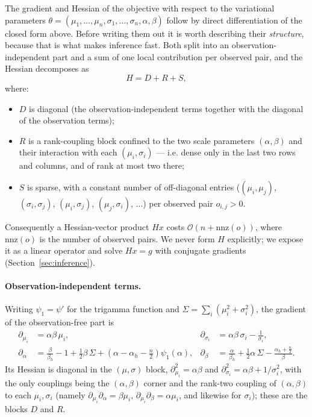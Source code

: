 \documentclass[12pt]{article}
\begin{document}
The gradient and Hessian of the objective with respect to the variational parameters
$\theta = (\mu_1, \dots, \mu_n, \sigma_1, \dots, \sigma_n, \alpha, \beta)$ follow by direct
differentiation of the closed form above. Before writing them out it is worth describing their
\emph{structure}, because that is what makes inference fast. Both split into an
observation-independent part and a sum of one local contribution per observed pair, and the
Hessian decomposes as
$$H = D + R + S,$$
where:
\begin{itemize}
    \item $D$ is diagonal (the observation-independent terms together with the diagonal of the
          observation terms);
    \item $R$ is a rank-coupling block confined to the two scale parameters $(\alpha, \beta)$
          and their interaction with each $(\mu_i, \sigma_i)$ --- i.e. dense only in the last
          two rows and columns, and of rank at most two there;
    \item $S$ is sparse, with a constant number of off-diagonal entries
          ($(\mu_i, \mu_j)$, $(\sigma_i, \sigma_j)$, $(\mu_i, \sigma_j)$, $(\mu_j, \sigma_i)$,
          $\dots$) per observed pair $o_{i,j} > 0$.
\end{itemize}
Consequently a Hessian-vector product $H x$ costs $\mathcal{O}(n + \mathrm{nnz}(o))$, where
$\mathrm{nnz}(o)$ is the number of observed pairs. We never form $H$ explicitly; we expose it as a
linear operator and solve $H x = g$ with conjugate gradients (Section~\ref{sec:inference}).

\paragraph{Observation-independent terms.}
Writing $\psi_1 = \psi'$ for the trigamma function and $\Sigma = \sum_i (\mu_i^2 + \sigma_i^2)$,
the gradient of the observation-free part is
\begin{align*}
    \partial_{\mu_i} &= \alpha\beta\,\mu_i, &
    \partial_{\sigma_i} &= \alpha\beta\,\sigma_i - \frac{1}{\sigma_i}, \\
    \partial_{\alpha} &= \frac{\beta}{\beta_h} - 1 + \tfrac{1}{2}\beta\,\Sigma
        + \left(\alpha - \alpha_h - \tfrac{n}{2}\right)\psi_1(\alpha), &
    \partial_{\beta} &= \frac{\alpha}{\beta_h} + \tfrac{1}{2}\alpha\,\Sigma
        - \frac{\alpha_h + \tfrac{n}{2}}{\beta}.
\end{align*}
Its Hessian is diagonal in the $(\mu,\sigma)$ block, $\partial^2_{\mu_i} = \alpha\beta$ and
$\partial^2_{\sigma_i} = \alpha\beta + 1/\sigma_i^2$, with the only couplings being the
$(\alpha,\beta)$ corner and the rank-two coupling of $(\alpha,\beta)$ to each $\mu_i, \sigma_i$
(namely $\partial_{\mu_i}\partial_\alpha = \beta\mu_i$, $\partial_{\mu_i}\partial_\beta = \alpha\mu_i$,
and likewise for $\sigma_i$); these are the blocks $D$ and $R$.
\end{document}
